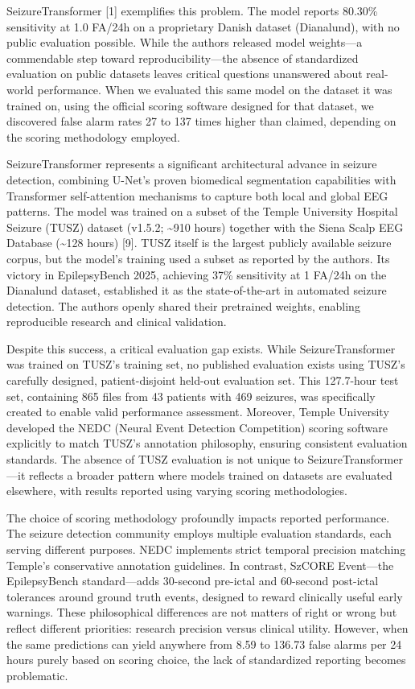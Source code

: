 \documentclass[
]{article}
\begin{document}
SeizureTransformer {[}1{]} exemplifies this problem. The model reports
80.30\% sensitivity at 1.0 FA/24h on a proprietary Danish dataset
(Dianalund), with no public evaluation possible. While the authors
released model weights---a commendable step toward reproducibility---the
absence of standardized evaluation on public datasets leaves critical
questions unanswered about real-world performance. When we evaluated
this same model on the dataset it was trained on, using the official
scoring software designed for that dataset, we discovered false alarm
rates 27 to 137 times higher than claimed, depending on the scoring
methodology employed.

SeizureTransformer represents a significant architectural advance in
seizure detection, combining U-Net's proven biomedical segmentation
capabilities with Transformer self-attention mechanisms to capture both
local and global EEG patterns. The model was trained on a subset of the
Temple University Hospital Seizure (TUSZ) dataset (v1.5.2;
\textasciitilde910 hours) together with the Siena Scalp EEG Database
(\textasciitilde128 hours) {[}9{]}. TUSZ itself is the largest publicly
available seizure corpus, but the model's training used a subset as
reported by the authors. Its victory in EpilepsyBench 2025, achieving
37\% sensitivity at 1 FA/24h on the Dianalund dataset, established it as
the state-of-the-art in automated seizure detection. The authors openly
shared their pretrained weights, enabling reproducible research and
clinical validation.

Despite this success, a critical evaluation gap exists. While
SeizureTransformer was trained on TUSZ's training set, no published
evaluation exists using TUSZ's carefully designed, patient-disjoint
held-out evaluation set. This 127.7-hour test set, containing 865 files
from 43 patients with 469 seizures, was specifically created to enable
valid performance assessment. Moreover, Temple University developed the
NEDC (Neural Event Detection Competition) scoring software explicitly to
match TUSZ's annotation philosophy, ensuring consistent evaluation
standards. The absence of TUSZ evaluation is not unique to
SeizureTransformer---it reflects a broader pattern where models trained
on datasets are evaluated elsewhere, with results reported using varying
scoring methodologies.

The choice of scoring methodology profoundly impacts reported
performance. The seizure detection community employs multiple evaluation
standards, each serving different purposes. NEDC implements strict
temporal precision matching Temple's conservative annotation guidelines.
In contrast, SzCORE Event---the EpilepsyBench standard---adds 30-second
pre-ictal and 60-second post-ictal tolerances around ground truth
events, designed to reward clinically useful early warnings. These
philosophical differences are not matters of right or wrong but reflect
different priorities: research precision versus clinical utility.
However, when the same predictions can yield anywhere from 8.59 to
136.73 false alarms per 24 hours purely based on scoring choice, the
lack of standardized reporting becomes problematic.
\end{document}
